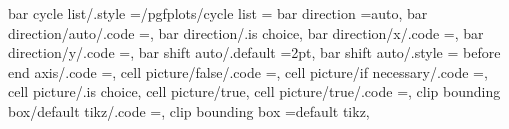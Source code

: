 {{{{{{bar cycle list/.style                                              ={/pgfplots/cycle list                                                                                                              ={%
bar direction                                                      =auto,                                                                                                                              
bar direction/auto/.code                                           =\def\pgfplots@bar@direction@choice{a},%
bar direction/.is choice,
bar direction/x/.code                                              =\def\pgfplots@bar@direction@choice{x},%
bar direction/y/.code                                              =\def\pgfplots@bar@direction@choice{y},%
bar shift auto/.default                                            ={2pt},%
bar shift auto/.style                                              ={%
before end axis/.code                                              =,                                                                                                                                  
cell picture/false/.code                                           =\def\pgfplots@cell@picture@mode{0},                                                                                                
cell picture/if necessary/.code                                    =\def\pgfplots@cell@picture@mode{2},                                                                                                
cell picture/.is choice,
cell picture/true, %
cell picture/true/.code                                            =\def\pgfplots@cell@picture@mode{1},                                                                                                
clip bounding box/default tikz/.code                               =\def\pgfplots@clip@BB@mode{0},                                                                                                     
clip bounding box                                                  =default tikz, %
}}}}}}}}}
